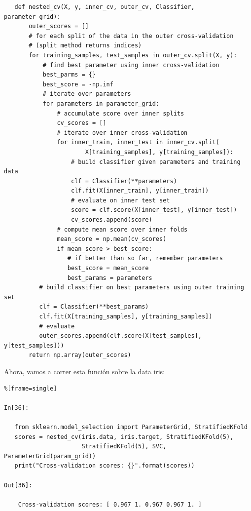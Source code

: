 {\begin{lstlisting}
   def nested_cv(X, y, inner_cv, outer_cv, Classifier, parameter_grid):
       outer_scores = []
       # for each split of the data in the outer cross-validation
       # (split method returns indices)
       for training_samples, test_samples in outer_cv.split(X, y):
           # find best parameter using inner cross-validation
           best_parms = {}
           best_score = -np.inf
           # iterate over parameters
           for parameters in parameter_grid:
               # accumulate score over inner splits
               cv_scores = []
               # iterate over inner cross-validation
               for inner_train, inner_test in inner_cv.split(
                       X[training_samples], y[training_samples]):
                   # build classifier given parameters and training data
                   clf = Classifier(**parameters)
                   clf.fit(X[inner_train], y[inner_train])
                   # evaluate on inner test set
                   score = clf.score(X[inner_test], y[inner_test])
                   cv_scores.append(score)
               # compute mean score over inner folds
               mean_score = np.mean(cv_scores)
               if mean_score > best_score:
                  # if better than so far, remember parameters
                  best_score = mean_score
                  best_params = parameters
          # build classifier on best parameters using outer training set
          clf = Classifier(**best_params)
          clf.fit(X[training_samples], y[training_samples])
          # evaluate
          outer_scores.append(clf.score(X[test_samples], y[test_samples]))
       return np.array(outer_scores)

\end{lstlisting}

Ahora, vamos a correr  esta función sobre la data iris: 

\begin{lstlisting}%[frame=single]

In[36]:
   
   from sklearn.model_selection import ParameterGrid, StratifiedKFold
   scores = nested_cv(iris.data, iris.target, StratifiedKFold(5),
                      StratifiedKFold(5), SVC, ParameterGrid(param_grid))
   print("Cross-validation scores: {}".format(scores))

Out[36]:
    
    Cross-validation scores: [ 0.967 1. 0.967 0.967 1. ]

\end{lstlisting}


}
